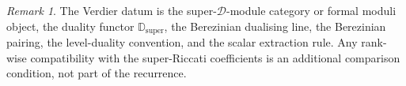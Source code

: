 \documentclass[11pt]{amsart}
\theoremstyle{definition}
\theoremstyle{remark}
\newtheorem{remark}[theorem]{Remark}
\begin{document}
\begin{remark}
The Verdier datum is the super-\(\mathcal D\)-module category or formal
moduli object, the duality functor \(\mathbb D_{\mathrm{super}}\), the
Berezinian dualising line, the Berezinian pairing, the level-duality
convention, and the scalar extraction rule. Any rank-wise compatibility
with the super-Riccati coefficients is an additional comparison
condition, not part of the recurrence.
\end{remark}
\end{document}
